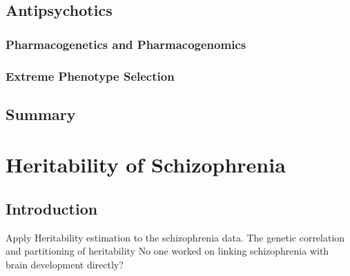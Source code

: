 \documentclass{book}
\begin{document}
	
	
	

	\section{Antipsychotics}
	\subsection{Pharmacogenetics and Pharmacogenomics}
	\subsection{Extreme Phenotype Selection}
	\section{Summary}
	
	
	
	\chapter{Heritability of Schizophrenia}
	\section{Introduction}
	Apply Heritability estimation to the schizophrenia data.
	The genetic correlation and partitioning of heritability
	No one worked on linking schizophrenia with brain development directly?
\end{document}
